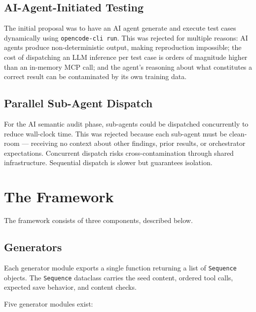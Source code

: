 \documentclass{article}
\begin{document}
\subsection{AI-Agent-Initiated Testing}
\label{sec:discarded-aiagent}

The initial proposal was to have an AI agent generate and execute test cases
dynamically using \texttt{opencode-cli run}. This was rejected for multiple
reasons: AI agents produce non-deterministic output, making reproduction
impossible; the cost of dispatching an LLM inference per test case is orders
of magnitude higher than an in-memory MCP call; and the agent's reasoning
about what constitutes a correct result can be contaminated by its own
training data.

\subsection{Parallel Sub-Agent Dispatch}
\label{sec:discarded-parallel}

For the AI semantic audit phase, sub-agents could be dispatched concurrently
to reduce wall-clock time. This was rejected because each sub-agent must be
clean-room --- receiving no context about other findings, prior results, or
orchestrator expectations. Concurrent dispatch risks cross-contamination through
shared infrastructure. Sequential dispatch is slower but guarantees isolation.

\section{The Framework}
\label{sec:framework}

The framework consists of three components, described below.

\subsection{Generators}
\label{sec:generators}

Each generator module exports a single function returning a list of
\texttt{Sequence} objects. The \texttt{Sequence} dataclass carries the seed
content, ordered tool calls, expected save behavior, and content checks.

Five generator modules exist:
\end{document}
